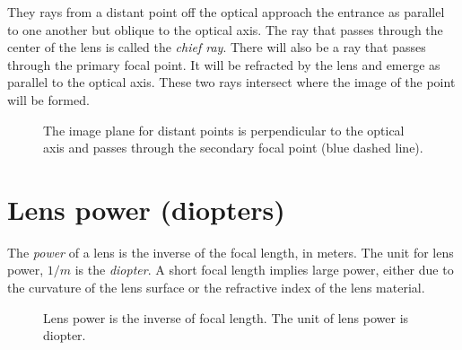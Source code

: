 \documentclass[
  letterpaper,
]{book}
\begin{document}
They rays from a distant point off the optical approach the entrance as
parallel to one another but oblique to the optical axis. The ray that
passes through the center of the lens is called the \emph{chief ray}.
There will also be a ray that passes through the primary focal point. It
will be refracted by the lens and emerge as parallel to the optical
axis. These two rays intersect where the image of the point will be
formed.

\begin{figure}


\caption{\label{fig-optics-focalplane}The image plane for distant points
is perpendicular to the optical axis and passes through the secondary
focal point (blue dashed line).}

\end{figure}%

\section{Lens power (diopters)}\label{sec-optics-lenspower}

The \emph{power} of a lens is the inverse of the focal length, in
meters. The unit for lens power, \(1/m\) is the \emph{diopter}. A short
focal length implies large power, either due to the curvature of the
lens surface or the refractive index of the lens material.

\begin{figure}


\caption{\label{fig-thinlens-power}Lens power is the inverse of focal
length. The unit of lens power is diopter.}

\end{figure}%
\end{document}
